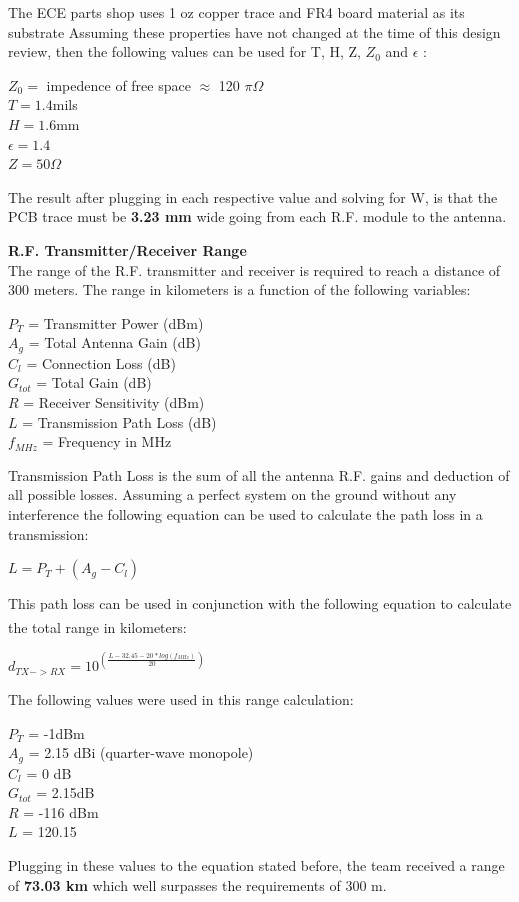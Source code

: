 \documentclass[letterpaper,10pt]{article}
\begin{document}
\begin{spacing}{1.15}
The ECE parts shop uses 1 oz copper trace and FR4 board material as its substrate \cite{ECE-Electronics-Shop} Assuming these properties have not changed at the time of this design review, then the following values can be used for T, H, Z, $Z_0$ and $\epsilon$ :
\begin{center}
	$Z_0 =$ impedence of free space $\approx$ 120 $\pi \Omega$ \\
	$T = 1.4 $mils\\
	$H =1.6 $mm\\
	$\epsilon = 1.4$ \\
	$Z = 50 \Omega$
\end{center}
The result after plugging in each respective value and solving for W, is that the PCB trace must be \textbf{3.23 mm} wide going from each R.F. module to the antenna.


\normalsize\textbf{R.F. Transmitter/Receiver Range} \\
The range of the R.F. transmitter and receiver is required to reach a distance of 300 meters. The range in kilometers is a function of the following variables:
\begin{center}
$P_T$ = Transmitter Power (dBm) \\
$A_g$ = Total Antenna Gain (dB) \\
$C_l$ = Connection Loss (dB) \\ 
$G_{tot}$ = Total Gain (dB) \\
$R$ = Receiver Sensitivity (dBm) \\
$L$ = Transmission Path Loss (dB) \\
$f_{MHz}$ = Frequency in MHz \\
\end{center}

Transmission Path Loss is the sum of all the antenna R.F. gains and deduction of all possible losses. Assuming a perfect system on the ground without any interference the following equation can be used to calculate the path loss in a transmission:
\begin{center}
	$L = P_T + (A_g - C_l)$
\end{center}
This path loss can be used in conjunction with the following equation to calculate the total range in kilometers\textsuperscript{\cite{RFDistance}}:
\begin{center}
	\large
	$d_{TX->RX} = 10^{\left( \frac{L - 32.45 -20*log(f_{MHz})}{20}\right)}$
\end{center}
The following values were used in this range calculation:
\begin{center}
$P_T$ = -1dBm \\
$A_g$ = 2.15 dBi (quarter-wave monopole) \\
$C_l$ = 0 dB \\ 
$G_{tot}$ =  2.15dB\\
$R$ = -116 dBm \\
$L$ =  120.15\\
\end{center}
Plugging in these values to the equation stated before, the team received a range of \textbf{73.03 km} which well surpasses the requirements of 300 m. \\


\end{spacing}
\end{document}
